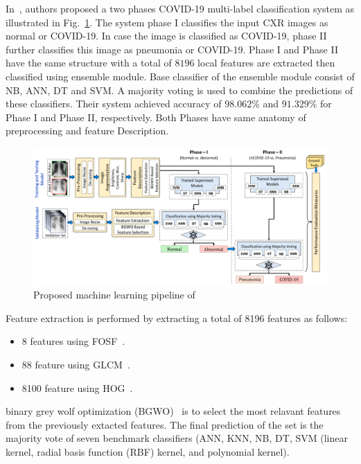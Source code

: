 In~\cite{acos}, authors proposed a two phases COVID-19 multi-label classification system as illustrated in Fig.~\ref{fig:Acos}. The system phase I classifies the input CXR images as normal or COVID-19. In case the image  is classified as COVID-19, phase II further classifies this image as pneumonia or COVID-19. Phase I and Phase II have the same structure with a total of $8196$  local features are extracted then classified using ensemble module. Base classifier of the ensemble module consist of NB, ANN, DT and SVM. A majority voting is used to combine the predictions of these classifiers. Their system achieved accuracy of $98.062$\%  and $91.329$\% for Phase I and Phase II, respectively. Both Phases have same anatomy of preprocessing and feature Description.
\begin{figure}
    \begin{center}
        \includegraphics[width=\textwidth]{Figures/ACoS.png}
        \caption{\label{fig:Acos} Proposed machine learning pipeline of~\cite{acos}}
    \end{center}
\end{figure}
Feature extraction is performed by extracting a total of 8196 features as follows:
\begin{itemize}
    \item 8 features using FOSF~\cite{srinivasan2008statistical}.
    \item 88 feature using GLCM~\cite{gomez2012analysis}.
    \item 8100 feature using HOG~\cite{dalal2005histograms}.
\end{itemize}
binary grey wolf optimization (BGWO)~\cite{mirjalili2014grey} is to select the most relavant features from the previously extacted features. The final prediction of the set is the majority vote of seven benchmark classifiers (ANN, KNN, NB, DT, SVM (linear kernel, radial basis function (RBF) kernel, and polynomial kernel).


